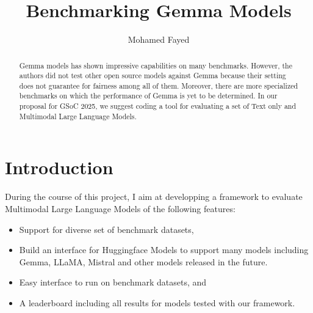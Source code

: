 \documentclass[
	letterpaper, %
]{jdf}
\author{Mohamed Fayed}
\title{Benchmarking Gemma Models}
\begin{document}
%
%
%

\begin{abstract}
Gemma models has shown impressive capabilities on many benchmarks.
However, the authors did not test other open source models against Gemma because their setting does not guarantee for fairness among all of them. %
    Moreover, there are more specialized benchmarks on which the performance of Gemma is yet to be determined.
    In our proposal for GSoC 2025, we suggest coding a tool for evaluating a set of Text only and Multimodal Large Language Models.
     \end{abstract}

\section{Introduction}
During the course of this project, I aim at developping a framework to evaluate Multimodal Large Language Models of the following features:
     \begin{itemize}
              \item Support for diverse set of benchmark datasets,
              \item Build an interface for Huggingface Models to support many models including Gemma, LLaMA, Mistral and other models released in the future.
              \item Easy interface to run on benchmark datasets, and
              \item A leaderboard including all results for models tested with our framework.
                   \end{itemize}
\end{document}
